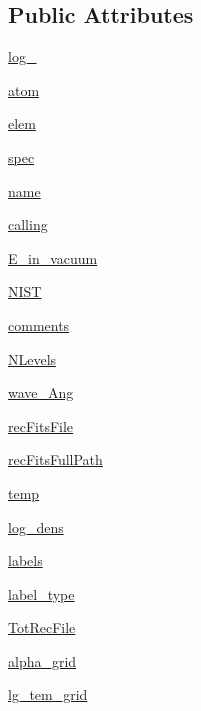 \subsection*{Public Attributes}
\begin{DoxyCompactItemize}
\item 
\hyperlink{classpyneb_1_1core_1_1pynebcore_1_1_rec_atom_ad901cd583cbb6a4008bc41013e16d82f}{log\+\_\+}
\item 
\hyperlink{classpyneb_1_1core_1_1pynebcore_1_1_rec_atom_a1a2aa175da6b5b8847f409e37437e3d3}{atom}
\item 
\hyperlink{classpyneb_1_1core_1_1pynebcore_1_1_rec_atom_a1325fff2854658752d522c7284df5a8a}{elem}
\item 
\hyperlink{classpyneb_1_1core_1_1pynebcore_1_1_rec_atom_ac2485287f7694915959ba49b9b82e483}{spec}
\item 
\hyperlink{classpyneb_1_1core_1_1pynebcore_1_1_rec_atom_abde95b732830df56b3d7713313f83060}{name}
\item 
\hyperlink{classpyneb_1_1core_1_1pynebcore_1_1_rec_atom_a82ec425ebba32b73a5d9ae52717d47c4}{calling}
\item 
\hyperlink{classpyneb_1_1core_1_1pynebcore_1_1_rec_atom_ad8b22dbde0d9861d94cf7aeacf0d93be}{E\+\_\+in\+\_\+vacuum}
\item 
\hyperlink{classpyneb_1_1core_1_1pynebcore_1_1_rec_atom_afe5a91d97ffefced34fb2f2c271736ec}{N\+I\+S\+T}
\item 
\hyperlink{classpyneb_1_1core_1_1pynebcore_1_1_rec_atom_ada8efc5b9724d1c0e76bd7c63508803e}{comments}
\item 
\hyperlink{classpyneb_1_1core_1_1pynebcore_1_1_rec_atom_a37c93c0fbaad583a1019f5930bc51999}{N\+Levels}
\item 
\hyperlink{classpyneb_1_1core_1_1pynebcore_1_1_rec_atom_aa2fd61021ea3067af77e7ee0053ace11}{wave\+\_\+\+Ang}
\item 
\hyperlink{classpyneb_1_1core_1_1pynebcore_1_1_rec_atom_a2108a27da329b8599357e990a446faae}{rec\+Fits\+File}
\item 
\hyperlink{classpyneb_1_1core_1_1pynebcore_1_1_rec_atom_af74fe68ebe037be119ac2f136485782b}{rec\+Fits\+Full\+Path}
\item 
\hyperlink{classpyneb_1_1core_1_1pynebcore_1_1_rec_atom_afdcfb955b81391dabcb298fe4990e33c}{temp}
\item 
\hyperlink{classpyneb_1_1core_1_1pynebcore_1_1_rec_atom_ac93e76934d279878d4f1f6d961df5488}{log\+\_\+dens}
\item 
\hyperlink{classpyneb_1_1core_1_1pynebcore_1_1_rec_atom_a0a758f4eb5a1b0780542eda87dcaeed3}{labels}
\item 
\hyperlink{classpyneb_1_1core_1_1pynebcore_1_1_rec_atom_a054cc66819a590792e6a2478136e2143}{label\+\_\+type}
\item 
\hyperlink{classpyneb_1_1core_1_1pynebcore_1_1_rec_atom_a3654e24299df680fe969486399e27880}{Tot\+Rec\+File}
\item 
\hyperlink{classpyneb_1_1core_1_1pynebcore_1_1_rec_atom_ad253222149ed56462daddaa2b9287cbb}{alpha\+\_\+grid}
\item 
\hyperlink{classpyneb_1_1core_1_1pynebcore_1_1_rec_atom_a6c6ed37093cbb2b2cf5a48df56357879}{lg\+\_\+tem\+\_\+grid}
\end{DoxyCompactItemize}
